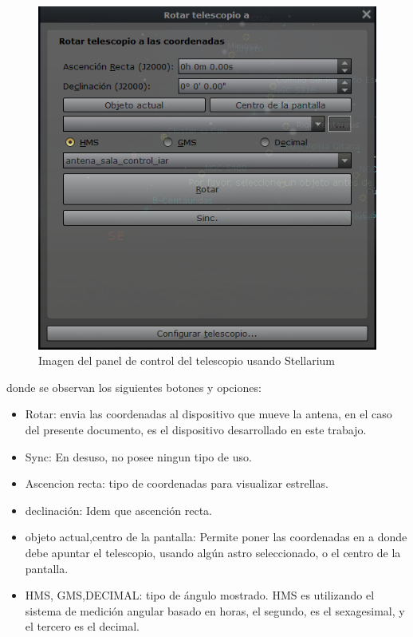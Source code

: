 \begin{figure}[ht!]
	\includegraphics{rotar_telesc}
	\caption{Imagen del panel de control del telescopio usando Stellarium}
	\label{control del telescopio en stellarium}
\end{figure}
donde se observan los siguientes botones y opciones: 
\begin{itemize}
	\item Rotar: envia las coordenadas al dispositivo que mueve la antena, en el caso del presente documento, es el dispositivo desarrollado en este trabajo. 
	\item Sync: En desuso, no posee ningun tipo de uso. 
	\item Ascencion recta: tipo de coordenadas para visualizar estrellas. 
	\item declinación: Idem que ascención recta.  
	\item objeto actual,centro de la pantalla: Permite poner las coordenadas en a donde debe apuntar el telescopio, usando algún astro seleccionado, o el centro de la pantalla. 
	\item HMS, GMS,DECIMAL: tipo de ángulo mostrado. HMS es utilizando el sistema de medición angular basado en horas, el segundo, es el sexagesimal, y el tercero es el decimal. 
\end{itemize}

